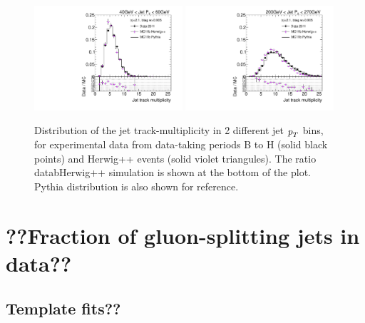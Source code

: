\begin{figure}[tp]
\centering
\includegraphics[width=0.49\textwidth]{FIGS/systematics/DataVarNtrkPT040.pdf}
\includegraphics[width=0.49\textwidth]{FIGS/systematics/DataVarNtrkPT200.pdf}
\caption{Distribution of the jet track-multiplicity in 2 different jet ${\emph{p}_{T}}$ bins, for experimental data from data-taking periods B to H (solid black points) and Herwig++ events (solid violet triangules). The ratio datab\/Herwig++ simulation is shown at the bottom of the plot. Pythia distribution is also shown for reference.}
\label{fig:herwigdatamc}
\end{figure}


%
%
\chapter{??Fraction of gluon-splitting jets in data??}

\section{Template fits??}\label{sec:FractionSystematics}

